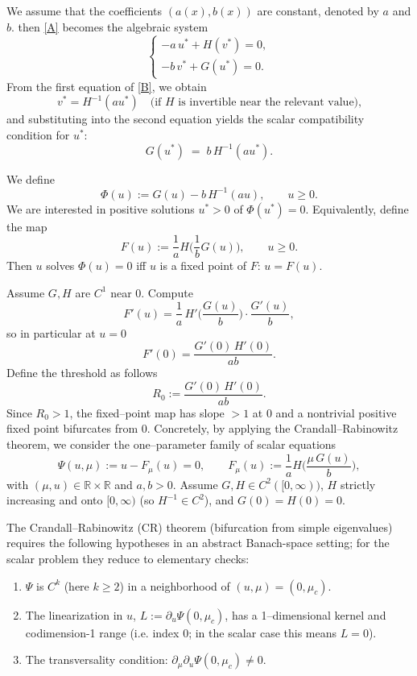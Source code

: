 \documentclass[a4paper,11pt]{amsart}
\theoremstyle{definition}
\numberwithin{equation}{section}
\theoremstyle{definition}
\begin{document}
We assume that the coefficients $(a(x), b(x))$ are constant, denoted by $a$ and $b$.
then
\eqref{A} becomes the algebraic system
\[
\begin{cases}
-a\,u^\ast + H(v^\ast) = 0,\\[4pt]
-b\,v^\ast + G(u^\ast) = 0.
\end{cases}
\label{B}
\]
From the first equation of \eqref{B}, we obtain
\begin{equation}\label{PS1}
v^\ast = H^{-1}(a u^\ast) \quad\text{(if $H$ is invertible near the relevant value),}
\end{equation}
and substituting into the second equation yields the scalar compatibility condition for $u^\ast$:
\begin{equation}\label{PS2}
G(u^\ast) \;=\; b\,H^{-1}(a u^\ast).
\end{equation}


We define
\[
\Phi(u):=G(u)-b\,H^{-1}(a u),\qquad u\ge0.
\]
We are interested in positive solutions \(u^\ast>0\) of \(\Phi(u^\ast)=0\). Equivalently, define the map
\[
F(u):=\frac{1}{a}H\!\bigg(\frac{1}{b}G(u)\bigg),\qquad u\geq0.
\]
Then \(u\) solves \(\Phi(u)=0\) iff \(u\) is a fixed point of \(F\): \(u=F(u)\).

  Assume \(G,H\) are \(C^1\) near \(0\). Compute
\[
F'(u)=\frac{1}{a}\,H'\!\Big(\frac{G(u)}{b}\Big)\!\cdot\!\frac{G'(u)}{b},
\]
so in particular at \(u=0\)
\[
F'(0)=\frac{G'(0)\,H'(0)}{ab}.
\]
Define the threshold as follows
\[
R_0:=\frac{G'(0)\,H'(0)}{ab}.
\]
Since  \(R_0>1\), the fixed–point map has slope \(>1\) at \(0\) and a nontrivial positive fixed point bifurcates from \(0\). Concretely, by applying  the Crandall–Rabinowitz theorem, we consider the one--parameter family of scalar equations
\[
\Psi(u,\mu):=u - F_\mu(u)=0,\qquad F_\mu(u):=\frac{1}{a}H\!\Big(\frac{\mu\,G(u)}{b}\Big),
\]
with $(\mu,u)\in\mathbb R\times\mathbb R$ and $a,b>0$. Assume $G,H\in C^2([0,\infty))$, $H$ strictly increasing and onto $[0,\infty)$ (so $H^{-1}\in C^2$), and $G(0)=H(0)=0$.

The Crandall--Rabinowitz (CR) theorem (bifurcation from simple eigenvalues) requires the following hypotheses in an abstract Banach-space setting; for the scalar problem they reduce to elementary checks:

\begin{enumerate}
  \item \(\Psi\) is \(C^k\) (here \(k\ge 2\)) in a neighborhood of \((u,\mu)=(0,\mu_c)\).
  \item The linearization in \(u\), \(L:=\partial_u\Psi(0,\mu_c)\), has a 1–dimensional kernel and codimension-1 range (i.e. index 0; in the scalar case this means \(L=0\)).
  \item The transversality condition: \(\partial_\mu\partial_u\Psi(0,\mu_c)\not=0\).
\end{enumerate}
\end{document}
